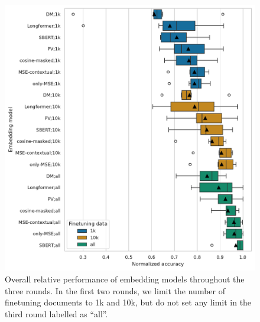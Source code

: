 \begin{figure}

  \includegraphics[width=\textwidth]{img/final_eval_norm_all.pdf}

  \caption{Overall relative performance of embedding models throughout the three
  rounds. In the first two rounds, we limit the number of finetuning documents to 1k
  and 10k, but do not set any limit in the third round labelled as ``all''.}

  \label{fig:final_eval_norm_all}

\end{figure}

